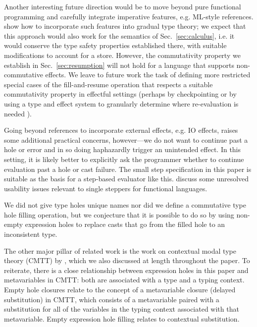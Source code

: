 %
Another interesting future direction would be to move beyond
pure functional programming and carefully integrate imperative features, e.g. ML-style references.
%
%
\citet{DBLP:conf/esop/SiekVCTG15} show how to incorporate such features into gradual type theory; we expect that this approach would also work for the semantics of Sec.~\ref{sec:calculus}, i.e. it would conserve the type safety properties established there, with suitable modifications to account for a store. However, the commutativity property we establish in Sec.~\ref{sec:resumption} will not hold for a language that supports non-commutative effects. We leave to future work the task of defining more restricted special cases of the fill-and-resume operation that respects a suitable commutativity property in effectful settings (perhaps by checkpointing or by using a type and effect system to granularly determine where re-evaluation is needed \cite{burckhardt2013s}).

%
Going beyond references to incorporate external effects, e.g. IO effects, raises some additional practical concerns, however---we do not want to continue past a hole or error and in so doing haphazardly trigger an unintended effect. In this setting, it is likely better to explicitly ask the programmer whether to continue evaluation past a hole or cast failure. The small step specification in this paper is suitable as the basis for a  step-based evaluator like this. \citet{ocaml-stepper} discuss some unresolved usability issues relevant to single steppers for functional languages. 

We did not give type holes unique names nor did we define a commutative type hole filling operation, but we conjecture that it is possible to do so by using non-empty expression holes to replace casts that go from the filled hole to an inconsistent type.



The other major pillar of related work is the work on contextual modal type theory (CMTT) by \citet{Nanevski2008}, which we also discussed at length throughout the paper. To reiterate, there is a close relationship between expression holes in this paper and metavariables in CMTT: both are associated with a type and a typing context. 
Empty hole closures 
relate to the concept of a {metavariable closure} (delayed substitution) in CMTT, which consists
of a metavariable paired with a substitution for all of the variables in the
typing context associated with that metavariable. 
Empty expression hole filling relates to contextual substitution. 

